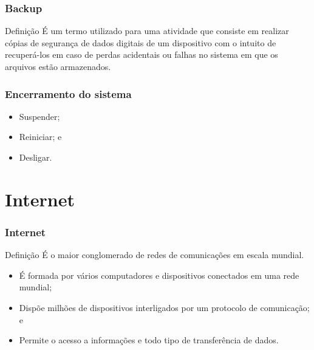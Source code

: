 \documentclass[aspectratio=169]{beamer} %
\begin{document}
\begin{frame}
	\frametitle{Backup}
		
	\begin{block}{Defini\c cão}
		É um termo utilizado para uma atividade que consiste em realizar cópias de segurança de dados digitais de um dispositivo com o intuito de recuperá-los em caso de perdas acidentais ou falhas no sistema em que os arquivos estão armazenados.
	\end{block}
\end{frame}

\begin{frame}
	\frametitle{Encerramento do sistema}
		
	\begin{itemize}
		\item Suspender;
		\item Reiniciar; e
		\item Desligar.
	\end{itemize}
\end{frame}

\section{Internet}

\begin{frame}
	\frametitle{Internet}
		
	\begin{block}{Defini\c cão}
		É o maior conglomerado de redes de comunicações em escala mundial.
	\end{block} \vfill
	
	\begin{itemize}
		\item É formada por vários computadores e dispositivos conectados em uma rede mundial;
		\item Dispõe milhões de dispositivos interligados por um protocolo de comunicação; e
		\item Permite o acesso a informações e todo tipo de transferência de dados.
	\end{itemize}
\end{frame}
\end{document}

